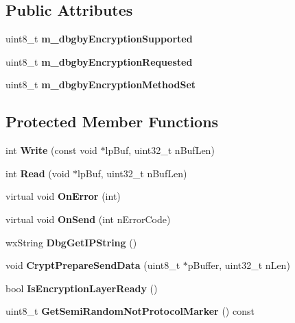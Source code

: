 \subsection*{Public Attributes}
\begin{DoxyCompactItemize}
\item 
uint8\_\-t {\bfseries m\_\-dbgbyEncryptionSupported}\label{classCEncryptedStreamSocket_a48f00e70fc57395fa34e2e6872e3640d}

\item 
uint8\_\-t {\bfseries m\_\-dbgbyEncryptionRequested}\label{classCEncryptedStreamSocket_a225a2ae8990f409a4031caa0a69e7061}

\item 
uint8\_\-t {\bfseries m\_\-dbgbyEncryptionMethodSet}\label{classCEncryptedStreamSocket_aac47d3fc918b1a32c436e0274a60c083}

\end{DoxyCompactItemize}
\subsection*{Protected Member Functions}
\begin{DoxyCompactItemize}
\item 
int {\bfseries Write} (const void $\ast$lpBuf, uint32\_\-t nBufLen)\label{classCEncryptedStreamSocket_af0a3ff54d5d392bf3deaf60b08d83aed}

\item 
int {\bfseries Read} (void $\ast$lpBuf, uint32\_\-t nBufLen)\label{classCEncryptedStreamSocket_a4b8b7d29f3059a9f63c53b76ca082523}

\item 
virtual void {\bfseries OnError} (int)\label{classCEncryptedStreamSocket_abfbfd572de4089b5564054a9fd569bed}

\item 
virtual void {\bfseries OnSend} (int nErrorCode)\label{classCEncryptedStreamSocket_a6d7fea1d07b944cbaeab0b6a05caca98}

\item 
wxString {\bfseries DbgGetIPString} ()\label{classCEncryptedStreamSocket_aa3a6e8983a311d862f157010c6cabaf1}

\item 
void {\bfseries CryptPrepareSendData} (uint8\_\-t $\ast$pBuffer, uint32\_\-t nLen)\label{classCEncryptedStreamSocket_a6905eb0e87345c955a6c1a05b94cdadc}

\item 
bool {\bfseries IsEncryptionLayerReady} ()\label{classCEncryptedStreamSocket_a496b1710e6b4b734729511e4e77747b3}

\item 
uint8\_\-t {\bfseries GetSemiRandomNotProtocolMarker} () const \label{classCEncryptedStreamSocket_ad68730757e34a1c02bbe19fc911b3079}

\end{DoxyCompactItemize}
